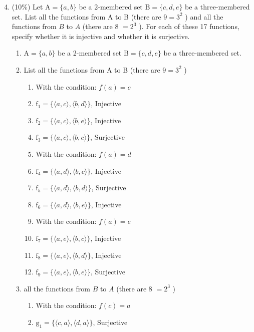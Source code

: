 \documentclass[10pt]{article}
\begin{document}
\begin{enumerate}
  \setcounter{enumi}{3}
  \item (10\%) Let $\mathrm{A}=\{a, b\}$ be a 2-membered set $\mathrm{B}=\{c, d, e\}$ be a three-membered set. List all the functions from A to B (there are $9=3^{2}$ ) and all the functions from $B$ to $A$ (there are 8 $=2^{3}$ ). For each of these 17 functions, specify whether it is injective and whether it is surjective.
  \begin{enumerate}
    \item $\mathrm{A}=\{a, b\}$ be a 2-membered set $\mathrm{B}=\{c, d, e\}$ be a three-membered set.
    \item List all the functions from A to B (there are $9=3^{2}$ )
    \begin{enumerate}
      \item With the condition: $f(a)=c$
      \item $\mathrm{f}_{1}=\{\langle a, c\rangle, \langle b, d\rangle\}$, Injective
      \item $\mathrm{f}_{2}=\{\langle a, c\rangle, \langle b, e\rangle\}$, Injective
      \item $\mathrm{f}_{3}=\{\langle a, c\rangle, \langle b, c\rangle\}$, Surjective
      \item With the condition: $f(a)=d$
      \item $\mathrm{f}_{4}=\{\langle a, d\rangle, \langle b, c\rangle\}$, Injective
      \item $\mathrm{f}_{5}=\{\langle a, d\rangle, \langle b, d\rangle\}$, Surjective
      \item $\mathrm{f}_{6}=\{\langle a, d\rangle, \langle b, e\rangle\}$, Injective
      \item With the condition: $f(a)=e$
      \item $\mathrm{f}_{7}=\{\langle a, e\rangle, \langle b, c\rangle\}$, Injective
      \item $\mathrm{f}_{8}=\{\langle a, e\rangle, \langle b, d\rangle\}$, Injective
      \item $\mathrm{f}_{9}=\{\langle a, e\rangle, \langle b, e\rangle\}$, Surjective
    \end{enumerate}
    \item all the functions from $B$ to $A$ (there are 8 $=2^{3}$ )
    \begin{enumerate}
      \item With the condition: $f(c)=a$
      \item $\mathrm{g}_{1}=\{\langle c, a\rangle, \langle d, a\rangle\}$, Surjective

\end{enumerate}
\end{enumerate}
\end{enumerate}
\end{document}
